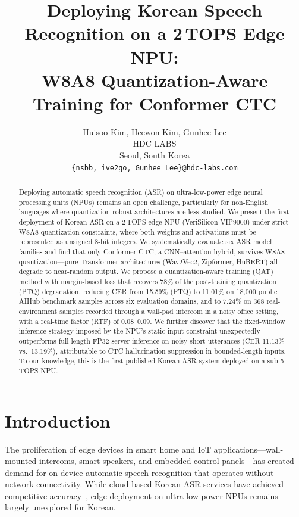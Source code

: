 \documentclass[a4paper,11pt,twocolumn]{article}
\title{\Large\bfseries Deploying Korean Speech Recognition on a 2\,TOPS Edge NPU:\\W8A8 Quantization-Aware Training for Conformer CTC}
\author{Huisoo Kim, Heewon Kim, Gunhee Lee\\[0.3em]
HDC LABS\\
Seoul, South Korea\\
\texttt{\{nsbb, ive2go, Gunhee\_Lee\}@hdc-labs.com}}
\date{}
\begin{document}
\maketitle

\begin{abstract}
Deploying automatic speech recognition (ASR) on ultra-low-power edge neural processing units (NPUs) remains an open challenge, particularly for non-English languages where quantization-robust architectures are less studied. We present the first deployment of Korean ASR on a 2\,TOPS edge NPU (VeriSilicon VIP9000) under strict W8A8 quantization constraints, where both weights and activations must be represented as unsigned 8-bit integers. We systematically evaluate six ASR model families and find that only Conformer CTC, a CNN--attention hybrid, survives W8A8 quantization---pure Transformer architectures (Wav2Vec2, Zipformer, HuBERT) all degrade to near-random output. We propose a quantization-aware training (QAT) method with margin-based loss that recovers 78\% of the post-training quantization (PTQ) degradation, reducing CER from 15.59\% (PTQ) to 11.01\% on 18,000 public AIHub benchmark samples across six evaluation domains, and to 7.24\% on 368 real-environment samples recorded through a wall-pad intercom in a noisy office setting, with a real-time factor (RTF) of 0.08--0.09. We further discover that the fixed-window inference strategy imposed by the NPU's static input constraint unexpectedly outperforms full-length FP32 server inference on noisy short utterances (CER 11.13\% vs.\ 13.19\%), attributable to CTC hallucination suppression in bounded-length inputs. To our knowledge, this is the first published Korean ASR system deployed on a sub-5\,TOPS NPU.
\end{abstract}

\section{Introduction}

The proliferation of edge devices in smart home and IoT applications---wall-mounted intercoms, smart speakers, and embedded control panels---has created demand for on-device automatic speech recognition that operates without network connectivity. While cloud-based Korean ASR services have achieved competitive accuracy~\cite{returnzero,clova}, edge deployment on ultra-low-power NPUs remains largely unexplored for Korean.
\end{document}
